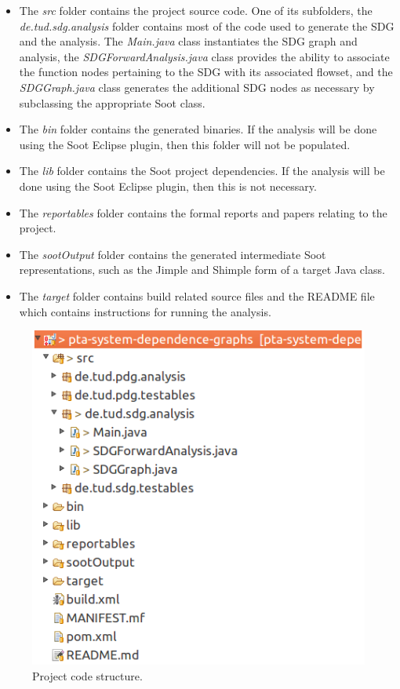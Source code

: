 \documentclass[authoryear,preprint]{sigplanconf}
\begin{document}
\begin{itemize}
  \item The \textit{src} folder contains the project source code. One of its subfolders, the \textit{de.tud.sdg.analysis} folder contains most of the code used to generate the SDG and the analysis. The \textit{Main.java} class instantiates the SDG graph and analysis, the \textit{SDGForwardAnalysis.java} class provides the ability to associate the function nodes pertaining to the SDG with its associated flowset, and the \textit{SDGGraph.java} class generates the additional SDG nodes as necessary by subclassing the appropriate Soot class.
  
  \item The \textit{bin} folder contains the generated binaries. If the analysis will be done using the Soot Eclipse plugin, then this folder will not be populated.
  
  \item The \textit{lib} folder contains the Soot project dependencies. If the analysis will be done using the Soot Eclipse plugin, then this is not necessary.
  
  \item The \textit{reportables} folder contains the formal reports and papers relating to the project.
  
  \item The \textit{sootOutput} folder contains the generated intermediate Soot representations, such as the Jimple and Shimple form of a target Java class.
  
  \item The \textit{target} folder contains build related source files and the README file which contains instructions for running the analysis.
\end{itemize}

\begin{figure}[ht]
	\centering
	\includegraphics[width=.9\linewidth]{figures/Selection_093}
	\caption[Project code structure.]{\label{f:structure}Project code structure.}
\end{figure}
\end{document}
